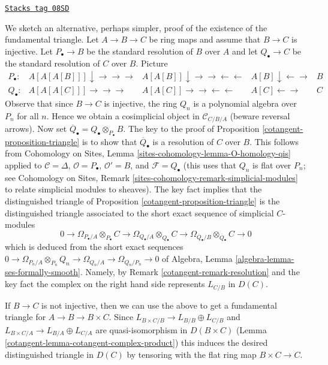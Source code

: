\begin{remark}[Triangle]
\label{cotangent-remark-triangle}
\href{https://stacks.math.columbia.edu/tag/08SD}{\texttt{Stacks tag 08SD}}

We sketch an alternative, perhaps simpler, proof of the existence of
the fundamental triangle.
Let $A \to B \to C$ be ring maps and assume that $B \to C$ is injective.
Let $P_\bullet \to B$ be the standard resolution of $B$ over $A$ and
let $Q_\bullet \to C$ be the standard resolution of $C$ over $B$.
Picture
$$
\begin{array}{ccccc}P_\bullet : & A[A[A[B]]] \downarrow\longrightarrow\longrightarrow\longrightarrow & A[A[B]] \downarrow\longrightarrow\longrightarrow\longleftarrow\longleftarrow & A[B] \downarrow\longleftarrow\longrightarrow & B \\ Q_\bullet : & A[A[A[C]]]
\longrightarrow\longrightarrow\longrightarrow & A[A[C]]
\longrightarrow\longrightarrow\longleftarrow\longleftarrow & A[C] \longleftarrow\longrightarrow & C\end{array}
$$
Observe that since $B \to C$ is injective, the ring $Q_n$ is a
polynomial algebra over $P_n$ for all $n$. Hence we obtain a cosimplicial
object in $\mathcal{C}_{C/B/A}$ (beware reversal arrows).
Now set $\overline{Q}_\bullet = Q_\bullet \otimes_{P_\bullet} B$.
The key to the proof of Proposition \ref{cotangent-proposition-triangle}
is to show that $\overline{Q}_\bullet$ is a resolution of $C$ over $B$.
This follows from Cohomology on Sites, Lemma
\ref{sites-cohomology-lemma-O-homology-qis}
applied to $\mathcal{C} = \Delta$, $\mathcal{O} = P_\bullet$,
$\mathcal{O}' = B$, and $\mathcal{F} = Q_\bullet$ (this uses that $Q_n$
is flat over $P_n$; see Cohomology on Sites, Remark
\ref{sites-cohomology-remark-simplicial-modules} to relate simplicial modules
to sheaves). The key fact implies that the distinguished triangle of
Proposition \ref{cotangent-proposition-triangle}
is the distinguished triangle associated to the short exact sequence
of simplicial $C$-modules
$$
0 \to
\Omega_{P_\bullet/A} \otimes_{P_\bullet} C \to
\Omega_{Q_\bullet/A} \otimes_{Q_\bullet} C \to
\Omega_{\overline{Q}_\bullet/B} \otimes_{\overline{Q}_\bullet} C \to 0
$$
which is deduced from the short exact sequences
$0 \to \Omega_{P_n/A} \otimes_{P_n} Q_n \to \Omega_{Q_n/A} \to
\Omega_{Q_n/P_n} \to 0$ of
Algebra, Lemma \ref{algebra-lemma-ses-formally-smooth}.
Namely, by Remark \ref{cotangent-remark-resolution} and the key fact the complex on the
right hand side represents $L_{C/B}$ in $D(C)$.

\medskip\noindent
If $B \to C$ is not injective, then we can use the above to get a
fundamental triangle for $A \to B \to B \times C$. Since
$L_{B \times C/B} \to L_{B/B} \oplus L_{C/B}$ and
$L_{B \times C/A} \to L_{B/A} \oplus L_{C/A}$
are quasi-isomorphism in $D(B \times C)$
(Lemma \ref{cotangent-lemma-cotangent-complex-product})
this induces the desired distinguished triangle in $D(C)$
by tensoring with the flat ring map $B \times C \to C$.
\end{remark}

